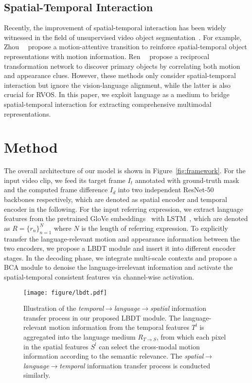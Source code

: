 \documentclass[10pt,twocolumn,letterpaper]{article}
\begin{document}
\subsection{Spatial-Temporal Interaction}
\label{sec:related:stm}

Recently, the improvement of spatial-temporal interaction has been widely witnessed in the field of unsupervised video object segmentation~\cite{zhou2020motion,ren2021reciprocal,fragkiadaki2015learning,li2018unsupervised,li2019motion,yan2019semi}.
For example, Zhou~\etal~\cite{zhou2020motion} propose a motion-attentive transition to reinforce spatial-temporal object representations with motion information.
Ren~\etal~\cite{ren2021reciprocal} propose a reciprocal transformation network to discover primary objects by correlating both motion and appearance clues. However, these methods only consider spatial-temporal interaction but ignore the vision-language alignment, while the latter is also crucial for RVOS.
In this paper, we exploit language as a medium to bridge spatial-temporal interaction for extracting comprehensive multimodal representations. 

\section{Method}
\label{sec:method}

The overall architecture of our model is shown in Figure~\ref{fig:framework}.
For the input video clip, we feed its target frame $I_t$ annotated with ground-truth mask and the computed frame difference $I_d$ into two independent ResNet-50~\cite{He2016CVPR} backbones respectively, which are denoted as spatial encoder and temporal encoder in the following.
For the input referring expression, we extract language features from the pretrained GloVe embeddings~\cite{pennington2014glove} with LSTM~\cite{hochreiter1997long}, which are denoted as $R=\{r_n\}_{n=1}^{N}$ where $N$ is the length of referring expression. To explicitly transfer the language-relevant motion and appearance information between the two encoders, we propose a LBDT module and insert it into different encoder stages. In the decoding phase, we integrate multi-scale contexts and propose a BCA module to denoise the language-irrelevant information and activate the spatial-temporal consistent features via channel-wise activation.


\begin{figure*}[t]
	\centering
		\texttt{[image: figure/lbdt.pdf]}
	\caption{Illustration of the \textit{temporal}$\rightarrow$\textit{language}$\rightarrow$\textit{spatial} information transfer process in our proposed LBDT module. The language-relevant motion information from the temporal features $T^l$ is aggregated into the language medium $R_{T\rightarrow S}$, from which each pixel in the spatial features $S^l$ can select the cross-modal motion information according to the semantic relevance. The \textit{spatial}$\rightarrow$\textit{language}$\rightarrow$\textit{temporal} information transfer process is conducted similarly.}
\label{fig:lbdt}
	
\end{figure*}
\end{document}
